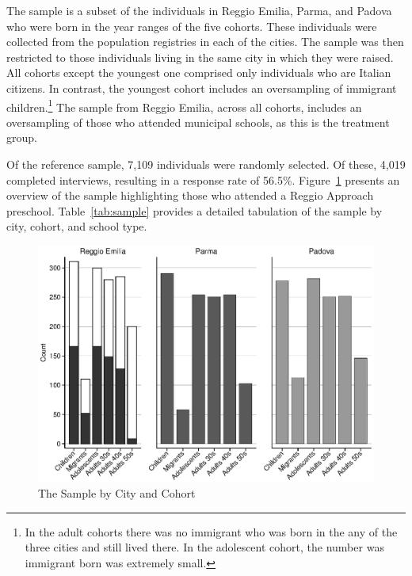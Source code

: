 The sample is a subset of the individuals in Reggio Emilia, Parma, and Padova who were born in the year ranges of the five cohorts.  These individuals were collected from the population registries in each of the cities. The sample was then restricted to those individuals living in the same city in which they were raised. All cohorts except the youngest one comprised only individuals who are Italian citizens. In contrast, the youngest cohort includes an oversampling of immigrant children.\footnote{In the adult cohorts there was no immigrant who was born in the any of the three cities and still lived there. In the adolescent cohort, the number was immigrant born was extremely small.} The sample from Reggio Emilia, across all cohorts, includes an oversampling of those who attended municipal schools, as this is the treatment group.

Of the reference sample, 7,109 individuals were randomly selected. Of these, 4,019 completed interviews, resulting in a response rate of 56.5\%. Figure~\ref{fig:sample} presents an overview of the sample highlighting those who attended a Reggio Approach preschool. Table~\ref{tab:sample} provides a detailed tabulation of the sample by city, cohort, and school type.

\begin{figure}[H]
\begin{center}
\caption{The Sample by City and Cohort}\label{fig:sample}
	\includegraphics[width=.9\textwidth]{../../Output/sample.eps}
\end{center}
\end{figure}

